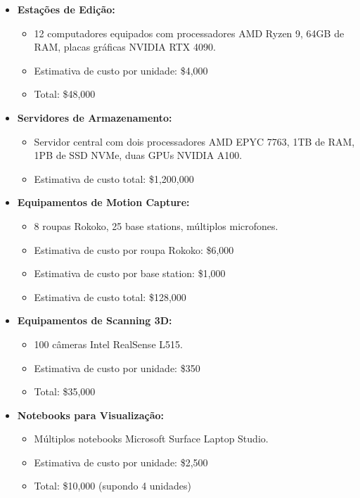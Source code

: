 \begin{itemize}
    \item \textbf{Estações de Edição:}
    \begin{itemize}
        \item 12 computadores equipados com processadores AMD Ryzen 9, 64GB de RAM, placas gráficas NVIDIA RTX 4090.
        \item Estimativa de custo por unidade: \$4,000
        \item Total: \$48,000
    \end{itemize}
    
    \item \textbf{Servidores de Armazenamento:}
    \begin{itemize}
        \item Servidor central com dois processadores AMD EPYC 7763, 1TB de RAM, 1PB de SSD NVMe, duas GPUs NVIDIA A100.
        \item Estimativa de custo total: \$1,200,000
    \end{itemize}
    
    \item \textbf{Equipamentos de Motion Capture:}
    \begin{itemize}
        \item 8 roupas Rokoko, 25 base stations, múltiplos microfones.
        \item Estimativa de custo por roupa Rokoko: \$6,000
        \item Estimativa de custo por base station: \$1,000
        \item Estimativa de custo total: \$128,000
    \end{itemize}
    
    \item \textbf{Equipamentos de Scanning 3D:}
    \begin{itemize}
        \item 100 câmeras Intel RealSense L515.
        \item Estimativa de custo por unidade: \$350
        \item Total: \$35,000
    \end{itemize}
    
    \item \textbf{Notebooks para Visualização:}
    \begin{itemize}
        \item Múltiplos notebooks Microsoft Surface Laptop Studio.
        \item Estimativa de custo por unidade: \$2,500
        \item Total: \$10,000 (supondo 4 unidades)
    \end{itemize}
    

\end{itemize}
